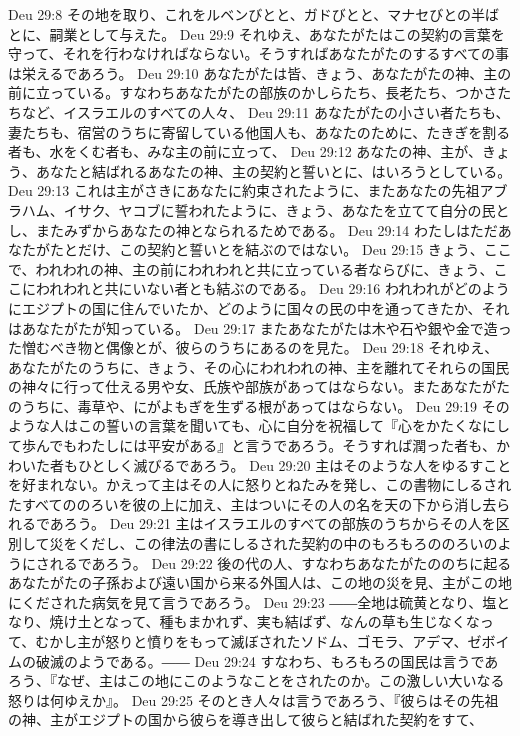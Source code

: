 Deu 29:8  その地を取り、これをルベンびとと、ガドびとと、マナセびとの半ばとに、嗣業として与えた。
Deu 29:9  それゆえ、あなたがたはこの契約の言葉を守って、それを行わなければならない。そうすればあなたがたのするすべての事は栄えるであろう。
Deu 29:10  あなたがたは皆、きょう、あなたがたの神、主の前に立っている。すなわちあなたがたの部族のかしらたち、長老たち、つかさたちなど、イスラエルのすべての人々、
Deu 29:11  あなたがたの小さい者たちも、妻たちも、宿営のうちに寄留している他国人も、あなたのために、たきぎを割る者も、水をくむ者も、みな主の前に立って、
Deu 29:12  あなたの神、主が、きょう、あなたと結ばれるあなたの神、主の契約と誓いとに、はいろうとしている。
Deu 29:13  これは主がさきにあなたに約束されたように、またあなたの先祖アブラハム、イサク、ヤコブに誓われたように、きょう、あなたを立てて自分の民とし、またみずからあなたの神となられるためである。
Deu 29:14  わたしはただあなたがたとだけ、この契約と誓いとを結ぶのではない。
Deu 29:15  きょう、ここで、われわれの神、主の前にわれわれと共に立っている者ならびに、きょう、ここにわれわれと共にいない者とも結ぶのである。
Deu 29:16  われわれがどのようにエジプトの国に住んでいたか、どのように国々の民の中を通ってきたか、それはあなたがたが知っている。
Deu 29:17  またあなたがたは木や石や銀や金で造った憎むべき物と偶像とが、彼らのうちにあるのを見た。
Deu 29:18  それゆえ、あなたがたのうちに、きょう、その心にわれわれの神、主を離れてそれらの国民の神々に行って仕える男や女、氏族や部族があってはならない。またあなたがたのうちに、毒草や、にがよもぎを生ずる根があってはならない。
Deu 29:19  そのような人はこの誓いの言葉を聞いても、心に自分を祝福して『心をかたくなにして歩んでもわたしには平安がある』と言うであろう。そうすれば潤った者も、かわいた者もひとしく滅びるであろう。
Deu 29:20  主はそのような人をゆるすことを好まれない。かえって主はその人に怒りとねたみを発し、この書物にしるされたすべてののろいを彼の上に加え、主はついにその人の名を天の下から消し去られるであろう。
Deu 29:21  主はイスラエルのすべての部族のうちからその人を区別して災をくだし、この律法の書にしるされた契約の中のもろもろののろいのようにされるであろう。
Deu 29:22  後の代の人、すなわちあなたがたののちに起るあなたがたの子孫および遠い国から来る外国人は、この地の災を見、主がこの地にくだされた病気を見て言うであろう。
Deu 29:23  ――全地は硫黄となり、塩となり、焼け土となって、種もまかれず、実も結ばず、なんの草も生じなくなって、むかし主が怒りと憤りをもって滅ぼされたソドム、ゴモラ、アデマ、ゼボイムの破滅のようである。――
Deu 29:24  すなわち、もろもろの国民は言うであろう、『なぜ、主はこの地にこのようなことをされたのか。この激しい大いなる怒りは何ゆえか』。
Deu 29:25  そのとき人々は言うであろう、『彼らはその先祖の神、主がエジプトの国から彼らを導き出して彼らと結ばれた契約をすて、
